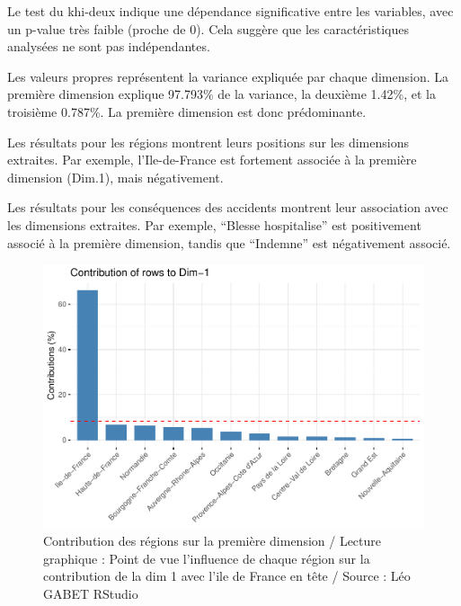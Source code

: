 \documentclass[french,]{compterendu}
\theoremstyle{urcastyle}
\theoremstyle{remark}
\begin{document}
Le test du khi-deux indique une dépendance significative entre les variables, avec un p-value très faible (proche de 0). Cela suggère que les caractéristiques analysées ne sont pas indépendantes.

Les valeurs propres représentent la variance expliquée par chaque dimension. La première dimension explique 97.793\% de la variance, la deuxième 1.42\%, et la troisième 0.787\%. La première dimension est donc prédominante.

Les résultats pour les régions montrent leurs positions sur les dimensions extraites. Par exemple, l'Ile-de-France est fortement associée à la première dimension (Dim.1), mais négativement.

Les résultats pour les conséquences des accidents montrent leur association avec les dimensions extraites. Par exemple, ``Blesse hospitalise'' est positivement associé à la première dimension, tandis que ``Indemne'' est négativement associé.

\begin{figure}[H]

{\centering \includegraphics[width=0.9\linewidth]{Rapport_ADD_LEO-GABET_files/figure-latex/afc2-1} 

}

\caption{Contribution des régions sur la première dimension / Lecture graphique : Point de vue l'influence de chaque région sur la contribution de la dim 1 avec l'ile de France en tête / Source : Léo GABET RStudio}\label{fig:afc2}
\end{figure}
\end{document}

